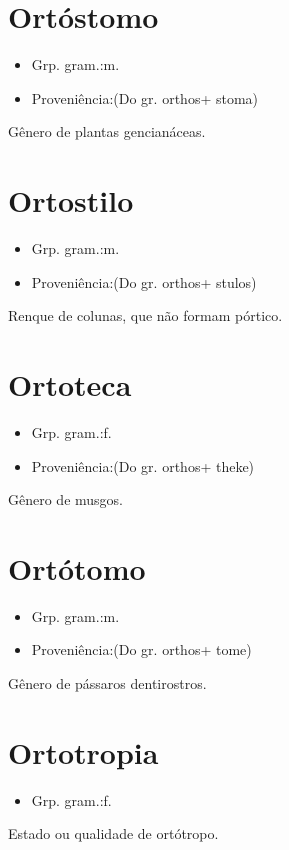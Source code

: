 \section{Ortóstomo}
\begin{itemize}
\item {Grp. gram.:m.}
\end{itemize}
\begin{itemize}
\item {Proveniência:(Do gr. \textunderscore orthos\textunderscore  + \textunderscore stoma\textunderscore )}
\end{itemize}
Gênero de plantas gencianáceas.
\section{Ortostilo}
\begin{itemize}
\item {Grp. gram.:m.}
\end{itemize}
\begin{itemize}
\item {Proveniência:(Do gr. \textunderscore orthos\textunderscore  + \textunderscore stulos\textunderscore )}
\end{itemize}
Renque de colunas, que não formam pórtico.
\section{Ortoteca}
\begin{itemize}
\item {Grp. gram.:f.}
\end{itemize}
\begin{itemize}
\item {Proveniência:(Do gr. \textunderscore orthos\textunderscore  + \textunderscore theke\textunderscore )}
\end{itemize}
Gênero de musgos.
\section{Ortótomo}
\begin{itemize}
\item {Grp. gram.:m.}
\end{itemize}
\begin{itemize}
\item {Proveniência:(Do gr. \textunderscore orthos\textunderscore  + \textunderscore tome\textunderscore )}
\end{itemize}
Gênero de pássaros dentirostros.
\section{Ortotropia}
\begin{itemize}
\item {Grp. gram.:f.}
\end{itemize}
Estado ou qualidade de ortótropo.
